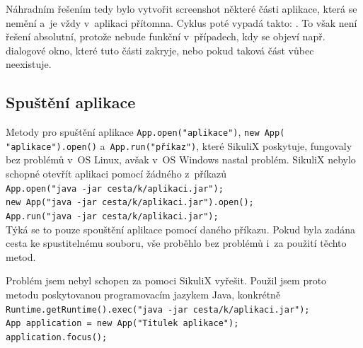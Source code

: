 		Náhradním řešením tedy bylo vytvořit screenshot některé části aplikace, která se nemění a~je vždy v~aplikaci přítomna. Cyklus poté vypadá takto: . To však není řešení absolutní, protože nebude funkční v~případech, kdy se objeví např. dialogové okno, které tuto části zakryje, nebo pokud taková část vůbec neexistuje.
		
		\subsection{Spuštění aplikace}
		Metody pro spuštění aplikace \texttt{App.open("aplikace")}, \texttt{new App(\\"aplikace").open()} a~\texttt{App.run("příkaz")}, které SikuliX poskytuje, fungovaly bez problémů v~OS Linux, avšak v~OS Windows nastal problém. SikuliX nebylo schopné otevřít aplikaci pomocí žádného z~příkazů\\[0.2cm]
		\texttt{App.open("java -jar cesta/k/aplikaci.jar");\\
		new App("java -jar cesta/k/aplikaci.jar").open();\\
		App.run("java -jar cesta/k/aplikaci.jar");}\\[0.2cm]
		Týká se to pouze spouštění aplikace pomocí daného příkazu. Pokud byla zadána cesta ke spustitelnému souboru, vše proběhlo bez problémů i~za použití těchto metod.
		
		Problém jsem nebyl schopen za pomoci SikuliX vyřešit. Použil jsem proto metodu poskytovanou programovacím jazykem Java, konkrétně\\[0.2cm]
		\texttt{Runtime.getRuntime().exec("java -jar cesta/k/aplikaci.jar");\\
		App application = new App("Titulek aplikace");\\
		application.focus();}